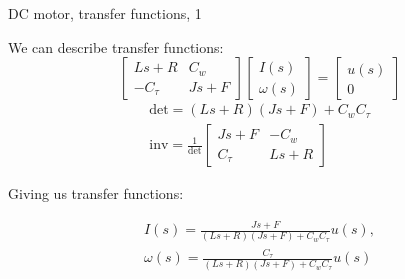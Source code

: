 \documentclass{beamer}
\begin{document}
\begin{frame}{DC motor, transfer functions, 1}
	\begin{flushleft}
		
		We can describe transfer functions:
		\begin{equation}
			\begin{bmatrix}
				Ls+R & C_w \\
				-C_\tau & Js+F
			\end{bmatrix}
			\begin{bmatrix}
				I(s) \\ \omega(s)
			\end{bmatrix}
		=
			\begin{bmatrix}
				u(s) \\ 0
			\end{bmatrix}
		\end{equation}
		\begin{align}
				\text{det} = (Ls+R)(Js+F)+ C_w C_\tau \\
				\text{inv} = \frac{1}{\text{det}}
				\begin{bmatrix}
					Js+F & -C_w \\
					C_\tau & Ls+R  
				\end{bmatrix} 
		\end{align}
	
	Giving us transfer functions:
	
	\begin{align}
		I(s)  = \frac{Js+F}{(Ls+R)(Js+F)+ C_w C_\tau} u(s), \\
		\omega(s)  = \frac{C_\tau}{(Ls+R)(Js+F)+ C_w C_\tau} u(s)
	\end{align}
		
		
	\end{flushleft}
\end{frame}
\end{document}
